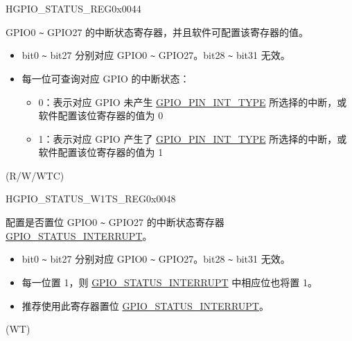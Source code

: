 \begin{register}{H}{GPIO\_STATUS\_REG}{0x0044}\label{regdesc:GPIOSTATUSREG}
%
\regnewline%
\begin{regdesc}\begin{reglist}
\label{fielddesc:GPIOSTATUSINTERRUPT}\item [GPIO\_STATUS\_INTERRUPT] GPIO0 \verb+~+ GPIO27 的中断状态寄存器，并且软件可配置该寄存器的值。
\begin{itemize}
    \item bit0 \verb+~+ bit27 分别对应 GPIO0 \verb+~+ GPIO27。bit28 \verb+~+ bit31 无效。
    \item 每一位可查询对应 GPIO 的中断状态：
    \begin{itemize}
        \item 0：表示对应 GPIO 未产生 \hyperref[fielddesc:GPIOPINNINTTYPE]{GPIO\_PIN\_INT\_TYPE} 所选择的中断，或软件配置该位寄存器的值为 0
        \item 1：表示对应 GPIO 产生了 \hyperref[fielddesc:GPIOPINNINTTYPE]{GPIO\_PIN\_INT\_TYPE} 所选择的中断，或软件配置该位寄存器的值为 1
    \end{itemize}
\end{itemize}
(R/W/WTC)
\end{reglist}\end{regdesc}
\end{register}


\begin{register}{H}{GPIO\_STATUS\_W1TS\_REG}{0x0048}\label{regdesc:GPIOSTATUSW1TSREG}
%
\regnewline%
\begin{regdesc}\begin{reglist}
\label{fielddesc:GPIOSTATUSW1TS}\item [GPIO\_STATUS\_W1TS] 配置是否置位 GPIO0 \verb+~+ GPIO27 的中断状态寄存器 \hyperref[fielddesc:GPIOSTATUSINTERRUPT]{GPIO\_STATUS\_INTERRUPT}。
\begin{itemize}
    \item bit0 \verb+~+ bit27 分别对应 GPIO0 \verb+~+ GPIO27。bit28 \verb+~+ bit31 无效。
    \item 每一位置 1，则 \hyperref[fielddesc:GPIOSTATUSINTERRUPT]{GPIO\_STATUS\_INTERRUPT} 中相应位也将置 1。
    \item 推荐使用此寄存器置位 \hyperref[fielddesc:GPIOSTATUSINTERRUPT]{GPIO\_STATUS\_INTERRUPT}。
\end{itemize}
(WT)
\end{reglist}\end{regdesc}
\end{register}


